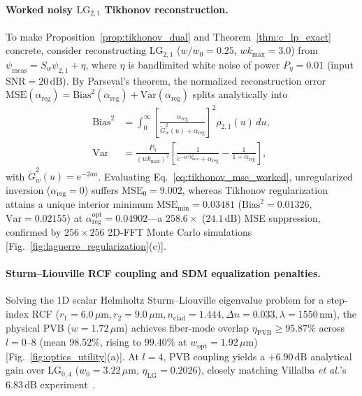 \documentclass[aps,pra,onecolumn,notitlepage,11pt,tightenlines,amsmath,amssymb,floatfix,longbibliography]{revtex4-2}
\begin{document}
\paragraph*{Worked noisy $\mathrm{LG}_{2,1}$ Tikhonov reconstruction.}
To make Proposition~\ref{prop:tikhonov_dual} and Theorem~\ref{thm:c_lp_exact} concrete, consider reconstructing $\mathrm{LG}_{2,1}$ ($w/w_0 = 0.25$, $w k_{\max} = 3.0$) from $\psi_{\mathrm{meas}} = S_w\psi_{2,1} + \eta$, where $\eta$ is bandlimited white noise of power $P_\eta = 0.01$ (input $\mathrm{SNR} = 20\,\mathrm{dB}$). By Parseval's theorem, the normalized reconstruction error $\mathrm{MSE}(\alpha_{\mathrm{reg}}) = \mathrm{Bias}^2(\alpha_{\mathrm{reg}}) + \mathrm{Var}(\alpha_{\mathrm{reg}})$ splits analytically into
\begin{align}
\mathrm{Bias}^2 &= \int_0^\infty \left[\frac{\alpha_{\mathrm{reg}}}{\widetilde{G}_w^2(u) + \alpha_{\mathrm{reg}}}\right]^2 \rho_{2,1}(u)\,du, \nonumber \\
\mathrm{Var} &= \frac{P_\eta}{(w k_{\max})^2}\left[\frac{1}{e^{-w^2 k_{\max}^2}+\alpha_{\mathrm{reg}}} - \frac{1}{1+\alpha_{\mathrm{reg}}}\right],
\label{eq:tikhonov_mse_worked}
\end{align}
with $\widetilde{G}_w^2(u) = e^{-2a u}$. Evaluating Eq.~\eqref{eq:tikhonov_mse_worked}, unregularized inversion ($\alpha_{\mathrm{reg}} = 0$) suffers $\mathrm{MSE}_0 = 9.002$, whereas Tikhonov regularization attains a unique interior minimum $\mathrm{MSE}_{\min} = 0.03481$ ($\mathrm{Bias}^2 = 0.01326$, $\mathrm{Var} = 0.02155$) at $\alpha_{\mathrm{reg}}^{\mathrm{opt}} = 0.04902$—a $258.6\times$ ($24.1\,\mathrm{dB}$) MSE suppression, confirmed by $256\times 256$ 2D-FFT Monte Carlo simulations [Fig.~\ref{fig:laguerre_regularization}(c)].

\paragraph*{Sturm--Liouville RCF coupling and SDM equalization penalties.}
Solving the 1D scalar Helmholtz Sturm--Liouville eigenvalue problem for a step-index RCF ($r_1 = 6.0\,\mu\mathrm{m}, r_2 = 9.0\,\mu\mathrm{m}, n_{\mathrm{clad}} = 1.444, \Delta n = 0.033, \lambda = 1550\,\mathrm{nm}$), the physical PVB ($w = 1.72\,\mu\mathrm{m}$) achieves fiber-mode overlap $\eta_{\mathrm{PVB}} \ge 95.87\%$ across $l=0\text{--}8$ (mean $98.52\%$, rising to $99.40\%$ at $w_{\mathrm{opt}} = 1.92\,\mu\mathrm{m}$) [Fig.~\ref{fig:optics_utility}(a)]. At $l=4$, PVB coupling yields a $+6.90\,\mathrm{dB}$ analytical gain over $\mathrm{LG}_{0,4}$ ($w_0 = 3.22\,\mu\mathrm{m}$, $\eta_{\mathrm{LG}} = 0.2026$), closely matching Villalba \emph{et al.}'s $6.83\,\mathrm{dB}$ experiment~\cite{Villalba2023}.
\end{document}
